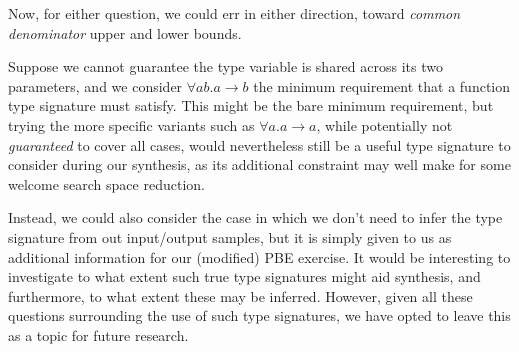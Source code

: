 \documentclass{article}
\begin{document}
    Now, for either question, we could err in either direction, toward \emph{common denominator} upper and lower bounds.

    Suppose we cannot guarantee the type variable is shared across its two parameters,
    and we consider $\forall a b . a \rightarrow b$ the minimum requirement that a function type signature must satisfy.
    This might be the bare minimum requirement,
    but trying the more specific variants such as $\forall a . a \rightarrow a$,
    while potentially not \emph{guaranteed} to cover all cases,
    would nevertheless still be a useful type signature to consider during our synthesis,
    as its additional constraint may well make for some welcome search space reduction.

    Instead, we could also consider the case in which we don't need to infer the type signature from out input/output samples,
    but it is simply given to us as additional information for our (modified) PBE exercise.
    It would be interesting to investigate to what extent such true type signatures
    might aid synthesis, and furthermore, to what extent these may be inferred.
    However, given all these questions surrounding the use of such type signatures,
    we have opted to leave this as a topic for future research.

\end{document}
